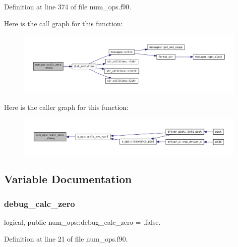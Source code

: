Definition at line 374 of file num\+\_\+ops.\+f90.

Here is the call graph for this function\+:
\nopagebreak
\begin{figure}[H]
\begin{center}
\leavevmode
\includegraphics[width=350pt]{namespacenum__ops_adcc4eacf15c931744316a004f4448b90_cgraph}
\end{center}
\end{figure}
Here is the caller graph for this function\+:
\nopagebreak
\begin{figure}[H]
\begin{center}
\leavevmode
\includegraphics[width=350pt]{namespacenum__ops_adcc4eacf15c931744316a004f4448b90_icgraph}
\end{center}
\end{figure}


\subsection{Variable Documentation}
\mbox{\label{namespacenum__ops_aca06cb91f215c46429e23fbaf8611e5a}} 
\subsubsection{\texorpdfstring{debug\+\_\+calc\+\_\+zero}{debug\_calc\_zero}}
{\footnotesize\ttfamily logical, public num\+\_\+ops\+::debug\+\_\+calc\+\_\+zero = .false.}



Definition at line 21 of file num\+\_\+ops.\+f90.

